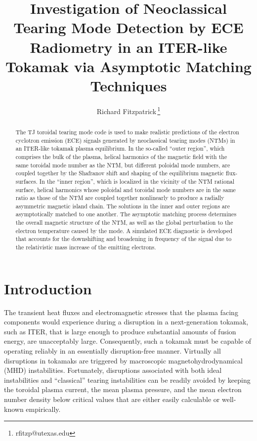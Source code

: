 \documentclass[12pt,prb,aps]{revtex4-1}
\begin{document}
\title{Investigation of Neoclassical Tearing Mode Detection by ECE Radiometry in  an ITER-like Tokamak via Asymptotic Matching Techniques}
\author{Richard Fitzpatrick\,\footnote{rfitzp@utexas.edu}}

\begin{abstract}
The TJ toroidal tearing mode code is used to make realistic predictions of  the electron cyclotron emission (ECE) signals generated by  neoclassical
tearing modes (NTMs) in an ITER-like tokamak plasma equilibrium. In the so-called ``outer region'', which comprises the bulk of the plasma, helical
harmonics of the magnetic field with the same toroidal mode number as the NTM, but different poloidal mode numbers, are coupled together by the Shafranov shift and
shaping of the equilibrium magnetic flux-surfaces. In the ``inner region'', which is localized in the vicinity of the NTM rational surface, helical harmonics whose
poloidal and toroidal mode numbers are in the same ratio as those of the NTM are coupled together nonlinearly to produce a radially asymmetric magnetic
island chain. The solutions in the inner and outer regions are asymptotically matched to one another. The asymptotic matching process determines the
overall magnetic structure of the NTM, as well as the global  perturbation to the electron temperature caused by the mode. A simulated ECE diagnostic is developed that accounts for the
 downshifting and broadening in frequency of the signal due to the relativistic mass increase of the emitting electrons. 

\end{abstract}
\maketitle

\section{Introduction}
The transient heat fluxes and electromagnetic stresses that the plasma facing components would experience during a disruption in
a next-generation tokamak, such as ITER,   that is large enough to produce substantial amounts of fusion energy, are unacceptably large.\cite{iter,wesson}  Consequently, such a tokamak must be capable of  operating reliably in an essentially disruption-free manner. 
Virtually all disruptions in tokamaks are triggered by macroscopic magnetohydrodynamical (MHD) instabilities.\cite{jet,vries} Fortunately, disruptions associated with both ideal instabilities   and
``classical'' tearing instabilities can   be readily avoided  by keeping the toroidal plasma current, the  mean plasma pressure, and
the mean electron number density below  critical values that are either easily calculable or well-known empirically.\cite{iter,decaf}  
\end{document}
